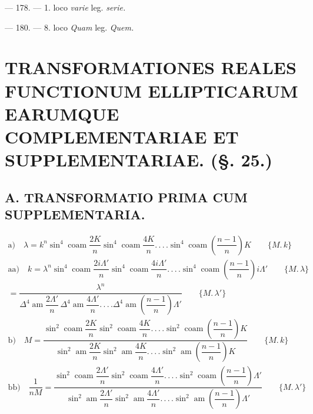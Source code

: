\documentclass{article}
\begin{document}
--- 178. --- 1. loco \emph{varie} leg. \emph{serie.}

--- 180. --- 8. loco \emph{Quam} leg. \emph{Quem.}

\section*{TRANSFORMATIONES REALES FUNCTIONUM ELLIPTICARUM EARUMQUE COMPLEMENTARIAE ET SUPPLEMENTARIAE. (§. 25.)}

\subsection*{A. TRANSFORMATIO PRIMA CUM SUPPLEMENTARIA.}

\[
\begin{gathered}
\text{a)}\quad \lambda=k^{n}\sin^{4}\operatorname{coam}\dfrac{2K}{n}\sin^{4}\operatorname{coam}\dfrac{4K}{n}.\,.\,.\,.\sin^{4}\operatorname{coam}\left(\dfrac{n-1}{n}\right)K\qquad\{M.\,k\}\\[1.5ex]
\text{aa)}\quad k=\lambda^{n}\sin^{4}\operatorname{coam}\dfrac{2i\Lambda'}{n}\sin^{4}\operatorname{coam}\dfrac{4i\Lambda'}{n}.\,.\,.\,.\sin^{4}\operatorname{coam}\left(\dfrac{n-1}{n}\right)i\Lambda'\qquad\{M.\,\lambda\}\\[1.5ex]
{}=\dfrac{\lambda^{n}}{\Delta^{4}\operatorname{am}\dfrac{2\Lambda'}{n}\,\Delta^{4}\operatorname{am}\dfrac{4\Lambda'}{n}.\,.\,.\,.\Delta^{4}\operatorname{am}\left(\dfrac{n-1}{n}\right)\Lambda'}\qquad\{M.\,\lambda'\}\\[1.5ex]
\text{b)}\quad M=\dfrac{\sin^{2}\operatorname{coam}\dfrac{2K}{n}\sin^{2}\operatorname{coam}\dfrac{4K}{n}.\,.\,.\,.\sin^{2}\operatorname{coam}\left(\dfrac{n-1}{n}\right)K}{\sin^{2}\operatorname{am}\dfrac{2K}{n}\sin^{2}\operatorname{am}\dfrac{4K}{n}.\,.\,.\,.\sin^{2}\operatorname{am}\left(\dfrac{n-1}{n}\right)K}\qquad\{M.\,k\}\\[1.5ex]
\text{bb)}\quad \dfrac{1}{nM}=\dfrac{\sin^{2}\operatorname{coam}\dfrac{2\Lambda'}{n}\sin^{2}\operatorname{coam}\dfrac{4\Lambda'}{n}.\,.\,.\,.\sin^{2}\operatorname{coam}\left(\dfrac{n-1}{n}\right)\Lambda'}{\sin^{2}\operatorname{am}\dfrac{2\Lambda'}{n}\sin^{2}\operatorname{am}\dfrac{4\Lambda'}{n}.\,.\,.\,.\sin^{2}\operatorname{am}\left(\dfrac{n-1}{n}\right)\Lambda'}\qquad\{M.\,\lambda'\}
\end{gathered}
\]
\end{document}
